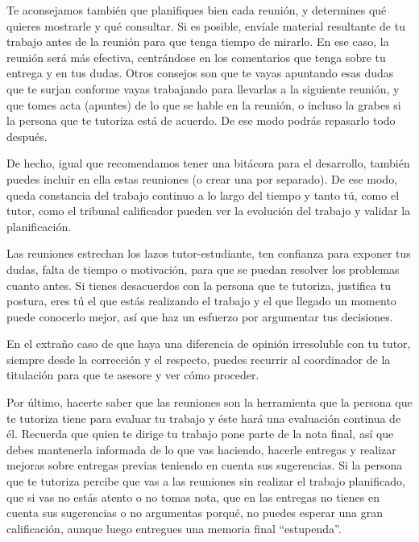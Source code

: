 Te aconsejamos también que planifiques bien cada reunión, y determines qué quieres mostrarle y qué consultar. Si es posible, envíale material resultante de tu trabajo antes de la reunión para que tenga tiempo de mirarlo. En ese caso, la reunión será más efectiva, centrándose en los comentarios que tenga sobre tu entrega y en tus dudas. Otros consejos son que te vayas apuntando esas dudas que te surjan conforme vayas trabajando para llevarlas a la siguiente reunión, y que tomes acta (apuntes) de lo que se hable en la reunión, o incluso la grabes si la persona que te tutoriza está de acuerdo. De ese modo podrás repasarlo todo después. 

De hecho, igual que recomendamos tener una bitácora para el desarrollo, también puedes incluir en ella estas reuniones (o crear una por separado). De ese modo, queda constancia del trabajo continuo a lo largo del tiempo y tanto tú, como el tutor, como el tribunal calificador pueden ver la evolución del trabajo y validar la planificación.

Las reuniones estrechan los lazos tutor-estudiante, ten confianza para exponer tus dudas, falta de tiempo o motivación, para que se puedan resolver los problemas cuanto antes. Si tienes desacuerdos con la persona que te tutoriza, justifica tu postura, eres tú el que estás realizando el trabajo y el que llegado un momento puede conocerlo mejor, así que haz un esfuerzo por argumentar tus decisiones. 

En el extraño caso de que haya una diferencia de opinión irresoluble con tu tutor, siempre desde la corrección y el respecto, puedes recurrir al coordinador de la titulación para que te asesore y ver cómo proceder. 


Por último, hacerte saber que las reuniones son la herramienta que la persona que te tutoriza tiene para evaluar tu trabajo y éste hará una evaluación continua de él. Recuerda que quien te dirige tu trabajo pone parte de la nota final, así que debes mantenerla informada de lo que vas haciendo, hacerle entregas y realizar mejoras sobre entregas previas teniendo en cuenta sus sugerencias. Si la persona que te tutoriza percibe que vas a las reuniones sin realizar el trabajo planificado, que si vas no estás atento o no tomas nota, que en las entregas no tienes en cuenta sus sugerencias o no argumentas porqué, no puedes esperar una gran calificación, aunque luego entregues una memoria final ``estupenda''.

